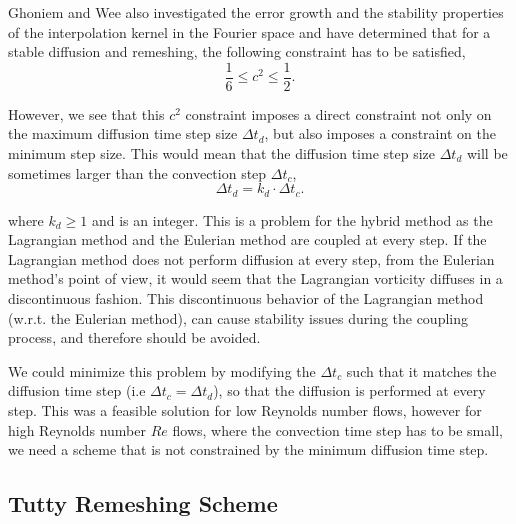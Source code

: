 Ghoniem and Wee also investigated the error growth and the stability properties of the interpolation kernel in the Fourier space and have determined that for a stable diffusion and remeshing, the following constraint has to be satisfied,
	\begin{equation}
	\frac{1}{6} \leqslant c^2 \leqslant \frac{1}{2}.
	\label{eq:c2stability}
	\end{equation}

However, we see that this $c^2$ constraint imposes a direct constraint not only on the maximum diffusion time step size $\Delta t_d$, but also imposes a constraint on the minimum step size. This would mean that the diffusion time step size $\Delta t_d$ will be sometimes larger than the convection step $\Delta t_c$,
	\begin{equation}
	\Delta t_d = k_d \cdot \Delta t_c.
	\label{eq:la_dtcts}
	\end{equation}

where $k_d \geqslant 1$ and is an integer. This is a problem for the hybrid method as the Lagrangian method and the Eulerian method are coupled at every step. If the Lagrangian method does not perform diffusion at every step, from the Eulerian method's point of view, it would seem that the Lagrangian vorticity diffuses in a discontinuous fashion. This discontinuous behavior of the Lagrangian method (w.r.t. the Eulerian method), can cause stability issues during the coupling process, and therefore should be avoided.

We could minimize this problem by modifying the $\Delta t_c$ such that it matches the diffusion time step (i.e $\Delta t_c = \Delta t_d$), so that the diffusion is performed at every step. This was a feasible solution for low Reynolds number flows, however for high Reynolds number $Re$ flows, where the convection time step has to be small, we need a scheme that is not constrained by the minimum diffusion time step.

\subsection{Tutty Remeshing Scheme}
\label{subsubsec:srs}

